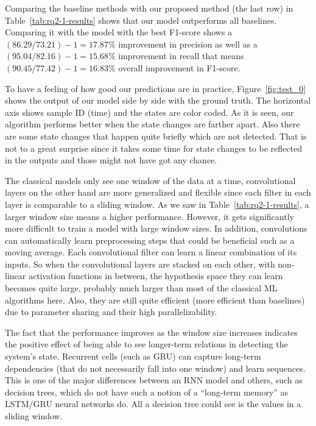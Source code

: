Comparing the baseline methods with our proposed method (the last row) in Table~\ref{tab:rq2-1-results} shows that our model outperforms all baselines. Comparing it with the model with the best F1-score shows a $(86.29/73.21)-1=17.87\%$ improvement in precision as well as a $(95.04/82.16)-1=15.68\%$ improvement in recall that means $(90.45/77.42)-1=16.83\%$ overall improvement in F1-score. 

To have a feeling of how good our predictions are in practice, Figure~\ref{fig:test_0} shows the output of our model side by side with the ground truth. The horizontal axis shows sample ID (time) and the states are color coded. As it is seen, our algorithm performs better when the state changes are farther apart. Also there are some state changes that happen quite briefly which are not detected. That is not to a great surprise since it takes some time for state changes to be reflected in the outputs and those might not have got any chance.


The classical models only see one window of the data at a time, convolutional layers on the other hand are more generalized and flexible since each filter in each layer is comparable to a sliding window. As we saw in Table~\ref{tab:rq2-1-results}, a larger window size means a higher performance. However, it gets significantly more difficult to train a model with large window sizes. In addition, convolutions can automatically learn preprocessing steps that could be beneficial such as a moving average. Each convolutional filter can learn a linear combination of its inputs. So when the convolutional layers are stacked on each other, with non-linear activation functions in between, the hypothesis space they can learn becomes quite large, probably much larger than most of the classical ML algorithms here. Also, they are still quite efficient (more efficient than baselines) due to parameter sharing and their high parallelizability.

The fact that the performance improves as the window size increases indicates the positive effect of being able to see longer-term relations in detecting the system's state. Recurrent cells (such as GRU) can capture long-term dependencies (that do not necessarily fall into one window) and learn sequences. This is one of the major differences between an RNN model and others, such as decision trees, which do not have such a notion of a ``long-term memory'' as LSTM/GRU neural networks do. All a decision tree could see is the values in a sliding window.

